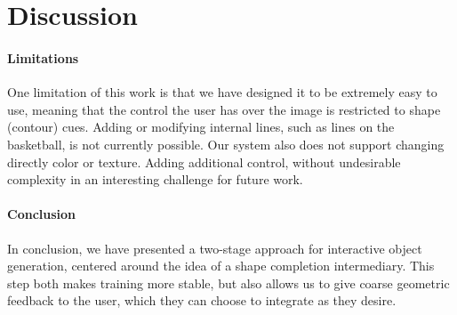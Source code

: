 
\section{Discussion}

\paragraph{Limitations}
One limitation of this work is that we have designed it to be extremely easy to use, meaning that the control the user has over the image is restricted to shape (contour) cues. 
Adding or modifying internal lines, such as lines on the basketball, is not currently possible. Our system also does not support changing directly color or texture. 
Adding additional control, without undesirable complexity in an interesting challenge for future work. 

\paragraph{Conclusion}
In conclusion, we have presented a two-stage approach for interactive object generation, centered around the idea of a shape completion intermediary. 
This step both makes training more stable, but also allows us to give coarse geometric feedback to the user, which they can choose to integrate as they desire. 





